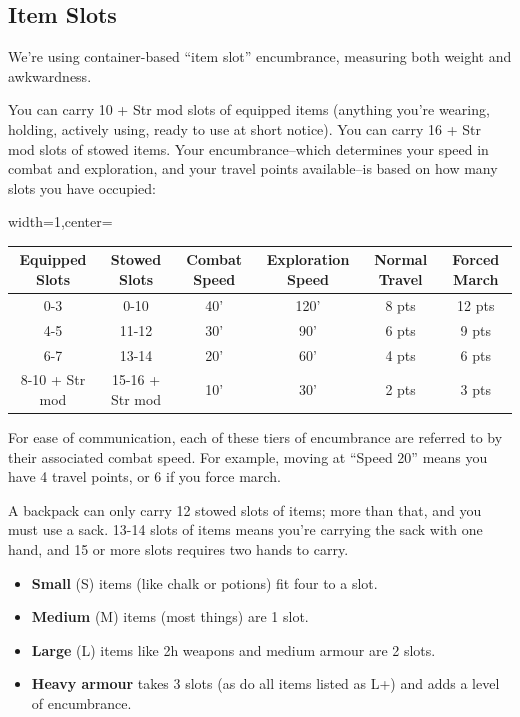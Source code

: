 \documentclass{book}
\providecommand{\tightlist}{%
\setlength{\itemsep}{0pt}\setlength{\parskip}{0pt}}
\begin{document}
\subsection*{Item Slots}\label{item-slots}

We're using container-based ``item slot'' encumbrance, measuring both
weight and awkwardness.

You can carry 10 + Str mod slots of equipped items (anything you're
wearing, holding, actively using, ready to use at short notice). You can
carry 16 + Str mod slots of stowed items. Your encumbrance--which
determines your speed in combat and exploration, and your travel points
available--is based on how many slots you have occupied:

\begin{table}[ht]
\centering
\begin{adjustbox}{width=1\textwidth,center=\textwidth}
\begin{tabular}{cccccc}
\toprule
    Equipped Slots & Stowed Slots &
    Combat Speed & Exploration Speed &
    Normal Travel & Forced March \\
    \midrule
    0-3 & 0-10 & 40' & 120' & 8 pts & 12 pts \\
    4-5 & 11-12 & 30' & 90' & 6 pts & 9 pts \\
    6-7 & 13-14 & 20' & 60' & 4 pts & 6 pts \\
    8-10 + Str mod & 15-16 + Str mod & 10' & 30' & 2 pts & 3 pts \\
\bottomrule
\end{tabular}
\end{adjustbox}
\end{table}

For ease of communication, each of these tiers of encumbrance are
referred to by their associated combat speed. For example, moving at
``Speed 20'' means you have 4 travel points, or 6 if you force march.

A backpack can only carry 12 stowed slots of items; more than that, and
you must use a sack. 13-14 slots of items means you're carrying the sack
with one hand, and 15 or more slots requires two hands to carry.

\begin{itemize}
\tightlist
\item
  \textbf{Small} (S) items (like chalk or potions) fit four to a slot.
\item
  \textbf{Medium} (M) items (most things) are 1 slot.
\item
  \textbf{Large} (L) items like 2h weapons and medium armour are 2
  slots.
\item
  \textbf{Heavy armour} takes 3 slots (as do all items listed as L+) and
  adds a level of encumbrance.
\end{itemize}
\end{document}
